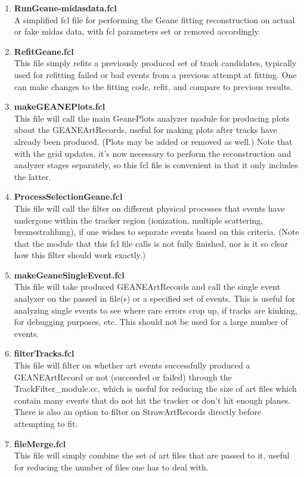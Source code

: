     \begin{enumerate}

      \item{\bf{RunGeane-midasdata.fcl}} \\
      A simplified fcl file for performing the Geane fitting reconstruction on actual or fake midas data, with fcl parameters set or removed accordingly.

      \item{\bf{RefitGeane.fcl}} \\
      This file simply refits a previously produced set of track candidates, typically used for refitting failed or bad events from a previous attempt at fitting. One can make changes to the fitting code, refit, and compare to previous results.

      \item{\bf{makeGEANEPlots.fcl}} \\
      This file will call the main GeanePlots analyzer module for producing plots about the GEANEArtRecords, useful for making plots after tracks have already been produced. (Plots may be added or removed as well.) Note that with the grid updates, it's now necessary to perform the reconstruction and analyzer stages separately, so this fcl file is convenient in that it only includes the latter.

      \item{\bf{ProcessSelectionGeane.fcl}} \\
      This file will call the filter on different physical processes that events have undergone within the tracker region (ionization, multiple scattering, bremsstrahlung), if one wishes to separate events based on this criteria. (Note that the module that this fcl file calls is not fully finished, nor is it so clear how this filter should work exactly.)

      \item{\bf{makeGeaneSingleEvent.fcl}} \\
      This file will take produced GEANEArtRecords and call the single event analyzer on the passed in file(s) or a specified set of events. This is useful for analyzing single events to see where rare errors crop up, if tracks are kinking, for debugging purposes, etc. This should not be used for a large number of events.

      \item{\bf{filterTracks.fcl}} \\
      This file will filter on whether art events successfully produced a GEANEArtRecord or not (succeeded or failed) through the TrackFilter\_module.cc, which is useful for reducing the size of art files which contain many events that do not hit the tracker or don't hit enough planes. There is also an option to filter on StrawArtRecords directly before attempting to fit.

      \item{\bf{fileMerge.fcl}} \\
      This file will simply combine the set of art files that are passed to it, useful for reducing the number of files one has to deal with.

    \end{enumerate}
